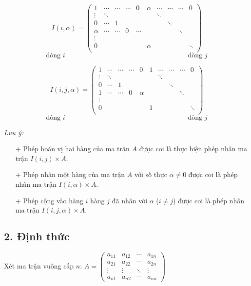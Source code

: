 \[
I(i, \alpha) = \begin{pmatrix}
1 & \cdots & \cdots & \cdots & 0 & \alpha & \cdots & \cdots & \cdots & 0 \\
\vdots & \ddots & & & & & \ddots & & & \\
0 & \cdots & 1 & & & & & \ddots & & \\
\alpha & \cdots & \cdots & 0 & \cdots & & & & \ddots & \\
\vdots & & & & & & & & & \\
0 & & & & & \alpha & & & & \ddots \\
\end{pmatrix} 
\]
\[
\text{dòng } i \quad \quad \quad \quad \quad \quad \quad \quad \quad \quad \quad \quad \quad \quad \quad \quad \quad \quad \text{dòng } j
\]

\[
I(i, j, \alpha) = \begin{pmatrix}
1 & \cdots & \cdots & \cdots & 0 & 1 & \cdots & \cdots & \cdots & 0 \\
\vdots & \ddots & & & & & \ddots & & & \\
0 & \cdots & 1 & & & & & \ddots & & \\
1 & \cdots & \cdots & 0 & \alpha & & & & \ddots & \\
\vdots & & & & & & & & & \\
0 & & & & & 1 & & & & \ddots \\
\end{pmatrix} 
\]
\[
\text{dòng } i \quad \quad \quad \quad \quad \quad \quad \quad \quad \quad \quad \quad \quad \quad \quad \quad \quad \quad \text{dòng } j
\]

\textit{Lưu ý:}
\begin{itemize}
    \item [+] Phép hoán vị hai hàng của ma trận \( A \) được coi là thực hiện phép nhân ma trận \( I(i, j) \times A \).
    \item [+] Phép nhân một hàng của ma trận \( A \) với số thực \( \alpha \neq 0 \) được coi là phép nhân ma trận \( I(i, \alpha) \times A \).
    \item [+] Phép cộng vào hàng \( i \) hàng \( j \) đã nhân với \( \alpha \) (\( i \neq j \)) được coi là phép nhân ma trận \( I(i, j, \alpha) \times A \).
\end{itemize}
\subsection*{2. Định thức}
Xét ma trận vuông cấp \( n \): \( A = \begin{pmatrix}
a_{11} & a_{12} & \cdots & a_{1n} \\
a_{21} & a_{22} & \cdots & a_{2n} \\
\vdots & \vdots & \ddots & \vdots \\
a_{n1} & a_{n2} & \cdots & a_{nn}
\end{pmatrix} \)

